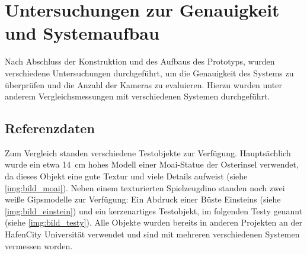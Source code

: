 \documentclass[./00PhotoBox.tex]{subfiles}
\begin{document}
\chapter{Untersuchungen zur Genauigkeit und Systemaufbau}
\label{c:versuche}
Nach Abschluss der Konstruktion und des Aufbaus des Prototyps, wurden verschiedene Untersuchungen durchgeführt, um die Genauigkeit des Systems zu überprüfen und die Anzahl der Kameras zu evaluieren. Hierzu wurden unter anderem Vergleichsmessungen mit verschiedenen Systemen durchgeführt.

\section{Referenzdaten}
\label{s:referenzdaten}
Zum Vergleich standen verschiedene Testobjekte zur Verfügung. Hauptsächlich wurde ein etwa \SI{14}{\centi\metre} hohes Modell einer Moai-Statue der Osterinsel verwendet, da dieses Objekt eine gute Textur und viele Details aufweist (siehe \autoref{img:bild_moai}). Neben einem texturierten Spielzeugdino standen noch zwei weiße Gipsmodelle zur Verfügung: Ein Abdruck einer Büste Einsteins  (siehe \autoref{img:bild_einstein}) und ein kerzenartiges Testobjekt, im folgenden Testy genannt (siehe \autoref{img:bild_testy}). Alle Objekte wurden bereits in anderen Projekten an der HafenCity Universität verwendet \citep[z.\,B.][]{kersten_scanner} und sind mit mehreren verschiedenen Systemen vermessen worden. 
\end{document}
